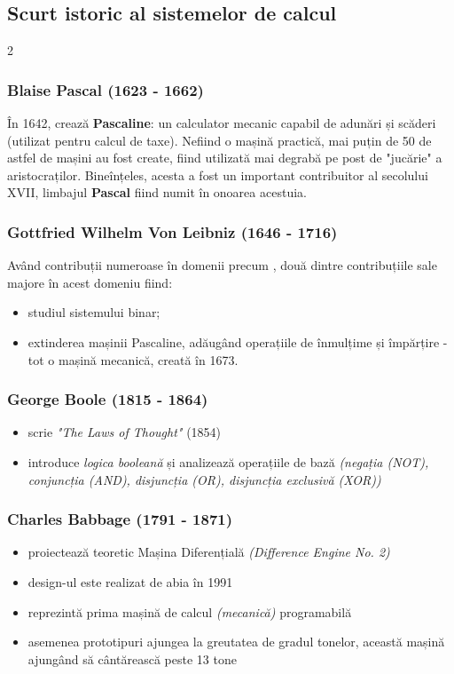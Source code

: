 \documentclass[a4paper,10pt]{article}
\begin{document}
\subsection{Scurt istoric al sistemelor de calcul}
\begin{multicols}{2}
\subsubsection{Blaise Pascal (1623 - 1662)}
În 1642, crează \textbf{Pascaline}: un calculator mecanic capabil de adunări și scăderi (utilizat pentru calcul de taxe). Nefiind o mașină practică, mai puțin de 50 de astfel de mașini au fost create, fiind utilizată mai degrabă pe post de "jucărie" a aristocraților. Bineînțeles, acesta a fost un important contribuitor al secolului XVII, limbajul \textbf{Pascal} fiind numit în onoarea acestuia. 
\subsubsection{Gottfried Wilhelm Von Leibniz (1646 - 1716)}
Având contribuții numeroase în domenii precum , două dintre contribuțiile sale majore în acest domeniu fiind:
\begin{itemize}
    \item studiul sistemului binar;
    \item extinderea mașinii Pascaline, adăugând operațiile de înmulțime și împărțire - tot o mașină mecanică, creată în 1673.
\end{itemize}
\subsubsection{George Boole (1815 - 1864)}
\begin{itemize}
    \item scrie \textit{"The Laws of Thought"} (1854)
    \item introduce \textit{logica booleană} și analizează operațiile de bază \textit{(negația (NOT), conjuncția (AND), disjuncția (OR), disjuncția exclusivă (XOR))}
\end{itemize}
\subsubsection{Charles Babbage (1791 - 1871)}
\begin{itemize}
    \item proiectează teoretic Mașina Diferențială \textit{(Difference Engine No. 2)}
    \item design-ul este realizat de abia în 1991
    \item reprezintă prima mașină de calcul \textit{(mecanică)} programabilă
    \item asemenea prototipuri ajungea la greutatea de gradul tonelor, această mașină ajungând să cântărească peste 13 tone
\end{itemize}

\end{multicols}
\end{document}
